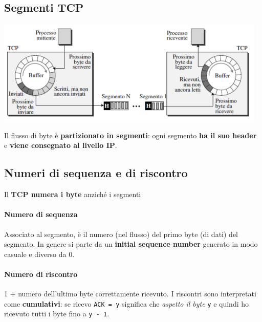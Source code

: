 \documentclass[10pt]{article}
\begin{document}
\subsection{Segmenti TCP}
\begin{center}
\includegraphics[scale=1]{segmentitcp.png}
\end{center}
Il flusso di byte è \textbf{partizionato in segmenti}: ogni segmento \textbf{ha il suo header} e \textbf{viene consegnato al livello IP}.
\pagebreak
\subsection{Numeri di sequenza e di riscontro}
Il \textbf{TCP numera i byte} anziché i segmenti
\paragraph{Numero di sequenza} Associato al segmento, è il numero (nel flusso) del primo byte (di dati) del segmento. In genere si parte da un \textbf{initial sequence number} generato in modo casuale e diverso da 0.
\paragraph{Numero di riscontro} 1 + numero dell'ultimo byte correttamente ricevuto. I riscontri sono interpretati come \textbf{cumulativi}: se ricevo \texttt{ACK = y} significa che \textit{aspetto il byte} \texttt{y} e quindi ho ricevuto tutti i byte fino a \texttt{y - 1}.
\end{document}

